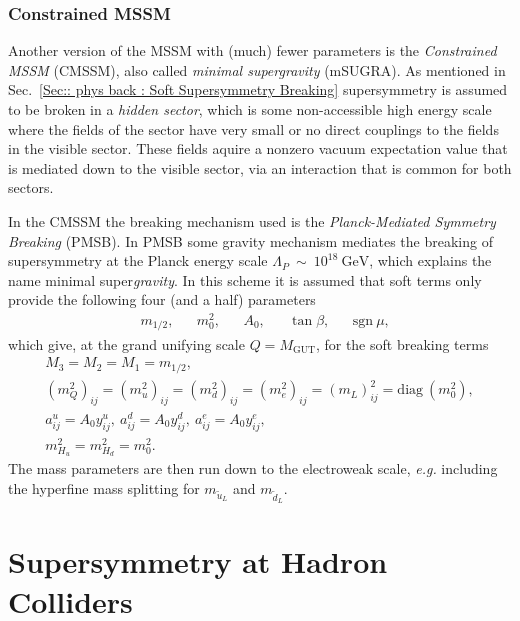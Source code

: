 \documentclass[twoside,english]{uiofysmaster}
\begin{document}
{\subsection{Constrained MSSM}\label{Sec:: physics back : CMSSM}

Another version of the MSSM with (much) fewer parameters is the \textit{Constrained MSSM} (CMSSM), also called \textit{minimal supergravity} (mSUGRA). As mentioned in Sec.~\ref{Sec:: phys back : Soft Supersymmetry Breaking} supersymmetry is assumed to be broken in a \textit{hidden sector}, which is some non-accessible high energy scale where the fields of the sector have very small or no direct couplings to the fields in the visible sector. These fields aquire a nonzero vacuum expectation value that is mediated down to the visible sector, via an interaction that is common for both sectors. 

In the CMSSM the breaking mechanism used is the \textit{Planck-Mediated Symmetry Breaking} (PMSB). In PMSB some gravity mechanism  mediates the breaking of supersymmetry at the Planck energy scale $\Lambda_P~\sim~10^{18}~\mathrm{GeV}$, which explains the name minimal super\textit{gravity}. In this scheme it is assumed that soft terms only provide the following four (and a half) parameters
\begin{align}
&m_{1/2}, &&m_0^2, &&A_0, &&\tan \beta, &&\mathrm{sgn}~ \mu,
\end{align}
which give, at the grand unifying scale $Q=M_{\mathrm{GUT}}$, for the soft breaking terms
\begin{align}
M_3 = M_2 = M_1 = m_{1/2},\\
(m_Q^2)_{ij} = (m_u^2)_{ij} = (m_d^2)_{ij} = (m_e^2)_{ij} = (m_L)^2_{ij} = \mathrm{diag}~ (m_0^2),\\
a^u_{ij} = A_0 y_{ij}^u, ~a^d_{ij} = A_0 y_{ij}^d,~a^e_{ij} = A_0 y^e_{ij},\\
m_{H_u}^2 = m_{H_d}^2 = m_0^2.
\end{align}
The mass parameters are then run down to the electroweak scale, \textit{e.g.} including the hyperfine mass splitting for $m_{\widetilde{u}_L}$ and $m_{\widetilde{d}_L}$.





\chapter{Supersymmetry at Hadron Colliders}\label{Chapter:Supersymmetry at Hadron Colliders}



}
\end{document}
